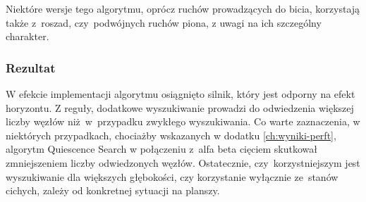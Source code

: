 Niektóre wersje tego algorytmu, oprócz ruchów prowadzących do bicia, korzystają także z~roszad, czy~podwójnych ruchów piona, z uwagi na ich szczególny charakter.

\subsubsection{Rezultat}

W efekcie implementacji algorytmu osiągnięto silnik, który jest odporny na efekt horyzontu.
Z reguły, dodatkowe wyszukiwanie prowadzi do odwiedzenia większej liczby węzłów niż~w~przypadku zwykłego wyszukiwania.
Co warte zaznaczenia, w niektórych przypadkach, chociażby wskazanych w dodatku \ref{ch:wyniki-perft}, algorytm Quiescence Search w połączeniu z~alfa beta cięciem skutkował zmniejszeniem liczby odwiedzonych węzłów.
Ostatecznie, czy~korzystniejszym jest wyszukiwanie dla większych głębokości, czy korzystanie wyłącznie ze~stanów cichych, zależy od konkretnej sytuacji na planszy.